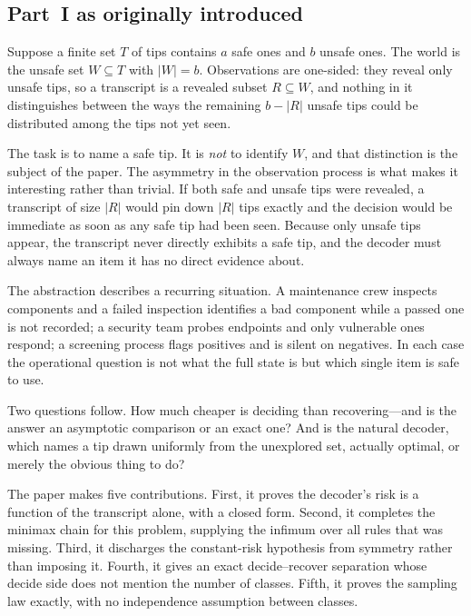 \subsection{Part~I as originally introduced}


Suppose a finite set $T$ of tips contains $a$ safe ones and $b$ unsafe ones. The world is the
unsafe set $W\subseteq T$ with $|W|=b$. Observations are one-sided: they reveal only unsafe
tips, so a transcript is a revealed subset $R\subseteq W$, and nothing in it distinguishes
between the ways the remaining $b-|R|$ unsafe tips could be distributed among the tips not yet
seen.

The task is to name a safe tip. It is \emph{not} to identify $W$, and that distinction is the
subject of the paper. The asymmetry in the observation process is what makes it interesting
rather than trivial. If both safe and unsafe tips were revealed, a transcript of size $|R|$
would pin down $|R|$ tips exactly and the decision would be immediate as soon as any safe tip
had been seen. Because only unsafe tips appear, the transcript never directly exhibits a safe
tip, and the decoder must always name an item it has no direct evidence about.

The abstraction describes a recurring situation. A maintenance crew inspects components and a
failed inspection identifies a bad component while a passed one is not recorded; a security
team probes endpoints and only vulnerable ones respond; a screening process flags positives
and is silent on negatives. In each case the operational question is not what the full state
is but which single item is safe to use.

Two questions follow. How much cheaper is deciding than recovering---and is the answer an
asymptotic comparison or an exact one? And is the natural decoder, which names a tip drawn
uniformly from the unexplored set, actually optimal, or merely the obvious thing to do?

The paper makes five contributions. First, it proves the decoder's risk is a function of the
transcript alone, with a closed form. Second, it completes the minimax chain for this problem,
supplying the infimum over all rules that was missing. Third, it discharges the constant-risk
hypothesis from symmetry rather than imposing it. Fourth, it gives an exact decide--recover
separation whose decide side does not mention the number of classes. Fifth, it proves the
sampling law exactly, with no independence assumption between classes.

